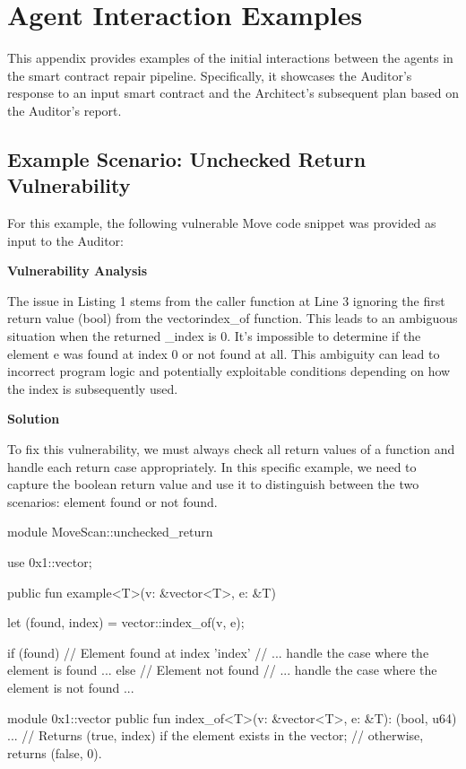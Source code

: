 \section{Agent Interaction Examples}
\label{sec:appendix_examples}

This appendix provides examples of the initial interactions between the agents in the smart contract repair pipeline. Specifically, it showcases the Auditor's response to an input smart contract and the Architect's subsequent plan based on the Auditor's report.


\begin{boxE}
\subsection{Example Scenario: Unchecked Return Vulnerability}

For this example, the following vulnerable Move code snippet was provided as input to the Auditor:

\begin{boxB}
\textbf{Vulnerability Analysis}

The issue in Listing 1 stems from the caller function at Line 3 ignoring the first return value (bool) from the vector\:\:index\_of function. This leads to an ambiguous situation when the returned \_index is 0.  It's impossible to determine if the element e was found at index 0 or not found at all. This ambiguity can lead to incorrect program logic and potentially exploitable conditions depending on how the index is subsequently used.

\textbf{Solution}

To fix this vulnerability, we must always check all return values of a function and handle each return case appropriately. In this specific example, we need to capture the boolean return value and use it to distinguish between the two scenarios: element found or not found.
\end{boxB}


\begin{boxL}
module MoveScan::unchecked\_return {
    use 0x1::vector;

    public fun example<T>(v: \&vector<T>, e: \&T) {
        let (found, index) = vector::index\_of(v, e);

        if (found) {
            // Element found at index 'index'
            // ... handle the case where the element is found ...
        } else {
            // Element not found
            // ... handle the case where the element is not found ...
        }
    }
}

module 0x1::vector {
    public fun index\_of<T>(v: \&vector<T>, e: \&T): (bool, u64) {...}
    // Returns (true, index) if the element exists in the vector;
    // otherwise, returns (false, 0).
}\end{boxL}
\end{boxE}

